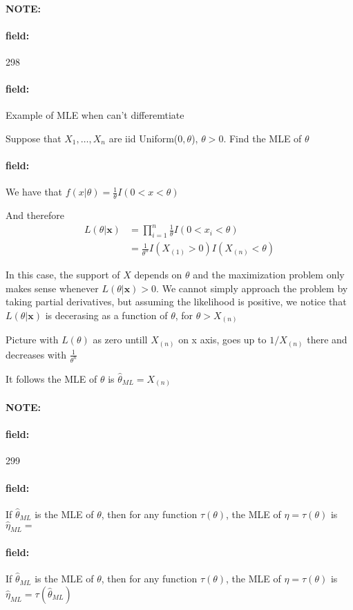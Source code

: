\documentclass[12pt]{article}
\newenvironment{note}{\paragraph{NOTE:}}{}
\newenvironment{field}{\paragraph{field:}}{}
\begin{document}
\begin{note} \begin{field} \tiny 298 \end{field}
  \begin{field}
    Example of MLE when can't differemtiate

    Suppose that $X_1, \ldots , X_n$ are iid Uniform($0,\theta$), $\theta > 0$. Find the MLE of $\theta$
  \end{field}
  \begin{field}
    We have that $f(x|\theta) = \frac{1}{\theta}I(0<x<\theta)$

    And therefore
    \begin{align*}
      L(\theta|\mathbf{x}) &= \prod _{i = 1}^n \frac{1}{\theta} I(0 < x_i < \theta)\\
      &= \frac{1}{\theta^n} I(X_{(1)} > 0)I(X_{(n)}< \theta)
    \end{align*}

    In this case, the support of $X$ depends on $\theta$ and the maximization problem only makes sense whenever $L(\theta|\mathbf{x}) > 0$. We cannot simply approach the problem by taking partial derivatives, but assuming the likelihood is positive, we notice that $L(\theta|\mathbf{x})$ is decerasing as a function of $\theta$, for $\theta > X_{(n)}$

    Picture with $L(\theta)$ as zero untill $X_{(n)}$ on x axis, goes up to $1/X_{(n)}$ there and decreases with $\frac{1}{\theta^n}$

    It follows the MLE of $\theta$ is $\hat{\theta}_{ML} = X_{(n)}$

  \end{field}
\end{note}







\begin{note} \begin{field} \tiny 299 \end{field}
  \begin{field}
    If $\hat{\theta}_{ML}$ is the MLE of $\theta$, then for any function $\tau(\theta)$, the MLE of $\eta =\tau(\theta)$ is $\hat{\eta}_{ML} =$
  \end{field}
  \begin{field}
    If $\hat{\theta}_{ML}$ is the MLE of $\theta$, then for any function $\tau(\theta)$, the MLE of $\eta =\tau(\theta)$ is $\hat{\eta}_{ML} = \tau(\hat{\theta}_{ML})$
  \end{field}
\end{note}
\end{document}
